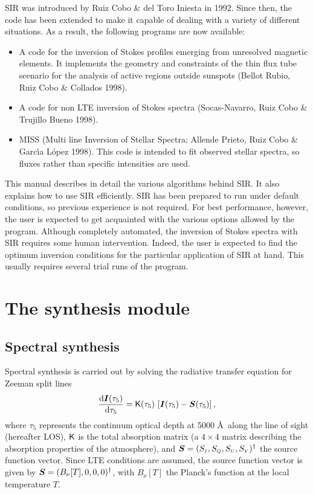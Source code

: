 \documentclass[11pt]{report}
\def\vec#1{\mbox{\boldmath $ #1$}}
\def\tens#1{\ifmmode\mathchoice{\mbox{$\sf\displaystyle#1$}}
{\mbox{$\sf\textstyle#1$}}
{\mbox{$\sf\scriptstyle#1$}}
{\mbox{$\sf\scriptscriptstyle#1$}}\else
\hbox{$\sf\textstyle#1$}\fi}
\begin{document}
SIR was introduced by Ruiz Cobo \& del Toro Iniesta in 1992. Since
then, the code has been extended to make it capable of dealing with a
variety of different situations. As a result, the following programs
are now available:
\begin{itemize}
\item A code for the inversion of Stokes profiles emerging from unresolved
magnetic elements. It implements the geometry and constraints of the thin 
flux tube scenario for the analysis of active regions outside sunspots 
(Bellot Rubio, Ruiz Cobo \& Collados 1998). 
\item A code for non LTE inversion of Stokes spectra (Socas-Navarro, 
Ruiz Cobo \& Trujillo Bueno 1998).
\item MISS (Multi line Inversion of Stellar Spectra; Allende Prieto, 
Ruiz Cobo \& Garc\'{\i}a L\'opez 1998). This code is intended to fit 
observed stellar spectra, so fluxes rather than specific intensities 
are used.  
\end{itemize} 

This manual describes in detail the various algorithms behind SIR. It
also explains how to use SIR efficiently. SIR has been prepared to run
under default conditions, so previous experience is not required. For
best performance, however, the user is expected to get acquainted with
the various options allowed by the program. Although completely
automated, the inversion of Stokes spectra with SIR requires some human
intervention. Indeed, the user is expected to find the optimum
inversion conditions for the particular application of SIR at hand. This
usually requires several trial runs of the program. 


\section{The synthesis module}
\subsection{Spectral synthesis}
Spectral synthesis is carried out by solving the radiative transfer
equation for Zeeman split lines  
\begin{displaymath}
\frac{{\rm d}\vec{I}(\tau_5)}{{\rm d}\tau_5} =  \tens{K}(\tau_5) \, \left[  \vec{I}(\tau_5) 
- \vec{S}(\tau_5) \right], 
\end{displaymath}
where $\tau_5$ represents the continuum optical depth at 5000 \AA\
along the line of sight (hereafter LOS), $\tens{K}$ is the total
absorption matrix (a $4\times4$ matrix describing the absorption
properties of the atmosphere), and $\vec{S} = (S_{\scriptscriptstyle
I},S_{\scriptscriptstyle Q}, S_{\scriptscriptstyle
U},S_{\scriptscriptstyle V})^{\dag}$ the source function vector. Since
LTE conditions are assumed, the source function vector is given by
$\vec{S} = (B_\nu[T],0,0,0)^{\dag}$, with $B_\nu[T]$ the Planck's function
at the local temperature $T$. 
\end{document}
